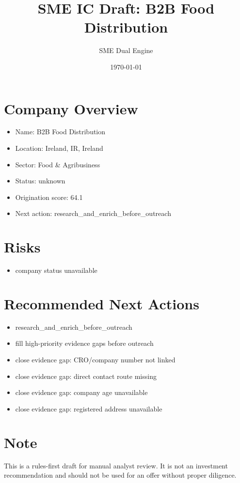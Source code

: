\documentclass[11pt,a4paper]{article}
\title{SME IC Draft: B2B Food Distribution}
\author{SME Dual Engine}
\date{\today}
\begin{document}
\maketitle
\section*{Company Overview}
\begin{itemize}[leftmargin=1.4em]
\item Name: B2B Food Distribution
\item Location: Ireland, IR, Ireland
\item Sector: Food \& Agribusiness
\item Status: unknown
\item Origination score: 64.1
\item Next action: research\_and\_enrich\_before\_outreach
\end{itemize}
\section*{Risks}
\begin{itemize}[leftmargin=1.4em]
\item company status unavailable
\end{itemize}
\section*{Recommended Next Actions}
\begin{itemize}[leftmargin=1.4em]
\item research\_and\_enrich\_before\_outreach
\item fill high-priority evidence gaps before outreach
\item close evidence gap: CRO/company number not linked
\item close evidence gap: direct contact route missing
\item close evidence gap: company age unavailable
\item close evidence gap: registered address unavailable
\end{itemize}
\section*{Note}
This is a rules-first draft for manual analyst review. It is not an investment
recommendation and should not be used for an offer without proper diligence.
\end{document}
